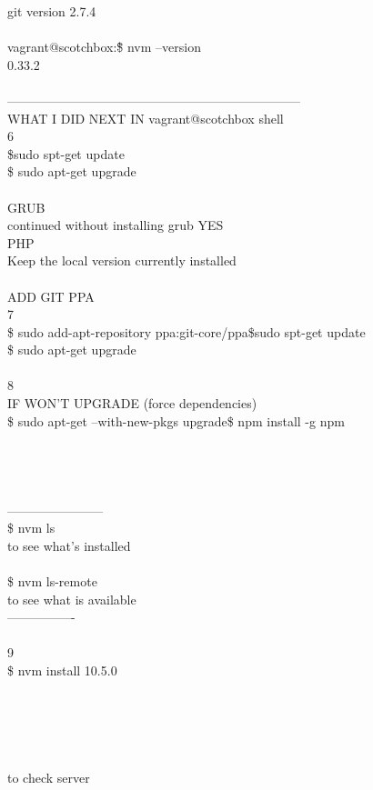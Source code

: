 \documentclass[10pt,a4paper]{article}
\begin{document}
{{{{{{{{{{{{{{{{{{{{{{{{git version 2.7.4\\
\\
vagrant@scotchbox:\~\$ nvm --version\\
0.33.2\\
\\
---------------------------------------------------------------------\\
WHAT I DID NEXT IN vagrant@scotchbox shell\\
6\\
\$sudo spt-get update\\
\$ sudo apt-get upgrade\\
\\
GRUB\\
continued without installing grub YES\\
PHP\\
Keep the local version currently installed\\
\\
ADD GIT PPA\\
7\\
\$ sudo add-apt-repository ppa:git-core/ppa\$sudo spt-get update\\
\$ sudo apt-get upgrade\\
\\
8\\
IF WON'T UPGRADE (force dependencies)\\
\$ sudo apt-get --with-new-pkgs upgrade\$ npm install -g npm\\
\\
[updated npm to 6.1.0]\\
\\
\\
-----------------------\\
\$ nvm ls   \\
to see what's installed\\
\\
\$ nvm ls-remote\\
to see what is available\\
----------------\\
\\
9\\
\$ nvm install 10.5.0\\
\\
[Now using node v10.5.0 (npm v6.1.0)]\\
\\
\\
\\
to check server\\
}}}}}}}}}}}}}}}}}}}}}}}}
\end{document}
